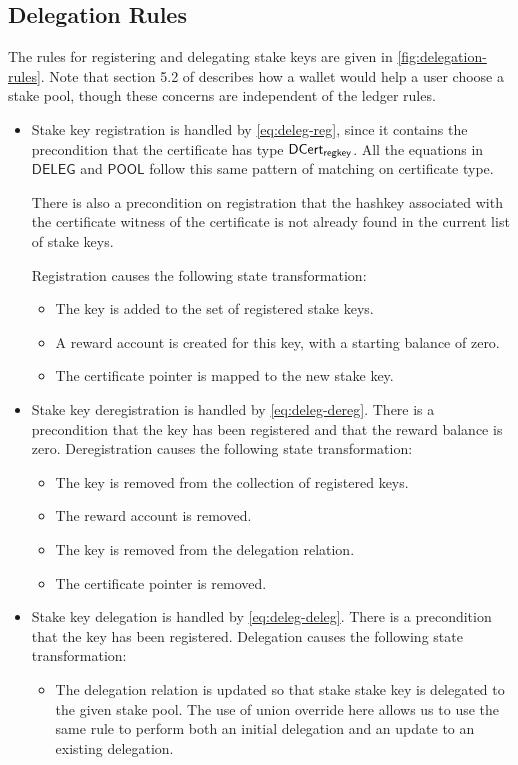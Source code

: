\clearpage

\subsection{Delegation Rules}
\label{sec:deleg-rules}


The rules for registering and delegating stake keys are given in \cref{fig:delegation-rules}.
Note that section 5.2 of \cite{delegation_design} describes how a wallet would help a user choose
a stake pool, though these concerns are independent of the ledger rules.

\begin{itemize}
  \item Stake key registration is handled by \cref{eq:deleg-reg}, since it contains the
    precondition that the certificate has type $\mathsf{DCert_{regkey}}$.
    All the equations in $\mathsf{DELEG}$ and $\mathsf{POOL}$ follow this same pattern of matching
    on certificate type.

    There is also a precondition on registration that the hashkey associated with the certificate
    witness of the certificate is not already found in the current list of stake keys.

    Registration causes the following state transformation:
    \begin{itemize}
      \item The key is added to the set of registered stake keys.
      \item A reward account is created for this key, with a starting balance of zero.
      \item The certificate pointer is mapped to the new stake key.
    \end{itemize}

  \item Stake key deregistration is handled by \cref{eq:deleg-dereg}.
    There is a precondition that the key has been registered and that the reward balance is zero.
    Deregistration causes the following state transformation:
    \begin{itemize}
      \item The key is removed from the collection of registered keys.
      \item The reward account is removed.
      \item The key is removed from the delegation relation.
      \item The certificate pointer is removed.
    \end{itemize}

  \item Stake key delegation is handled by \cref{eq:deleg-deleg}.
    There is a precondition that the key has been registered.
    Delegation causes the following state transformation:
    \begin{itemize}
      \item The delegation relation is updated so that stake stake key is delegated to the given
        stake pool. The use of union override here allows us to use the same rule
        to perform both an initial delegation and an update to an existing delegation.
    \end{itemize}
\end{itemize}
